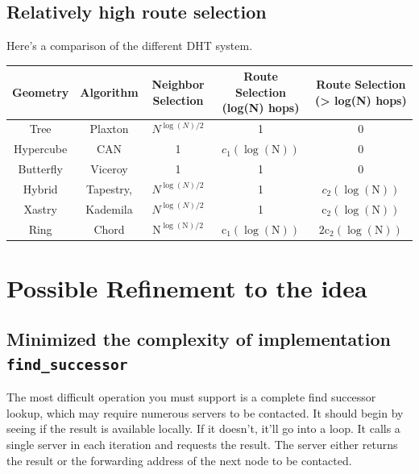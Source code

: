 \documentclass[acmlarge]{acmart}
\begin{document}
\subsection{Relatively high route selection}
Here's a comparison of the different DHT system.\\
\begin{tabular}{|c|c|c|c|c|}
  \hline Geometry  & Algorithm & Neighbor Selection                   & Route Selection (log(N) hops)       & Route Selection (> log(N) hops)       \\
  \hline Tree      & Plaxton   & $N^{\log (N) / 2}$                   & 1                                   & 0                                     \\
  \hline Hypercube & CAN       & 1                                    & $c_{1}(\log (\mathrm{N}))$          & 0                                     \\
  \hline Butterfly & Viceroy   & 1                                    & 1                                   & 0                                     \\
  \hline Hybrid    & Tapestry, & $N^{\log (N) / 2}$                   & 1                                   & $c_{2}(\log (\mathrm{N}))$            \\
  \hline Xastry    & Kademila  & $N^{\log (N) / 2}$                   & 1                                   & $\mathrm{c}_{2}(\log (\mathrm{N}))$   \\
  \hline Ring      & Chord     & $\mathrm{N}^{\log (\mathrm{N}) / 2}$ & $\mathrm{c}_{1}(\log (\mathrm{N}))$ & $2 \mathrm{c}_{2}(\log (\mathrm{N}))$ \\
  \hline
\end{tabular}
\section{Possible Refinement to the idea}
\subsection{Minimized the complexity of implementation \texttt{find\_successor}}
The most difficult operation you must support is a complete find successor lookup, which may require numerous servers to be contacted. It should begin by seeing if the result is available locally. If it doesn't, it'll go into a loop. It calls a single server in each iteration and requests the result. The server either returns the result or the forwarding address of the next node to be contacted. 
\end{document}
